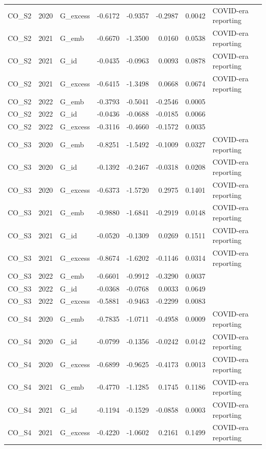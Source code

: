 \begin{tabular}{lllrrrrl}
CO\_S2 & 2020 & G\_excess & -0.6172 & -0.9357 & -0.2987 & 0.0042 & COVID-era reporting \\
CO\_S2 & 2021 & G\_emb & -0.6670 & -1.3500 & 0.0160 & 0.0538 & COVID-era reporting \\
CO\_S2 & 2021 & G\_id & -0.0435 & -0.0963 & 0.0093 & 0.0878 & COVID-era reporting \\
CO\_S2 & 2021 & G\_excess & -0.6415 & -1.3498 & 0.0668 & 0.0674 & COVID-era reporting \\
CO\_S2 & 2022 & G\_emb & -0.3793 & -0.5041 & -0.2546 & 0.0005 &  \\
CO\_S2 & 2022 & G\_id & -0.0436 & -0.0688 & -0.0185 & 0.0066 &  \\
CO\_S2 & 2022 & G\_excess & -0.3116 & -0.4660 & -0.1572 & 0.0035 &  \\
CO\_S3 & 2020 & G\_emb & -0.8251 & -1.5492 & -0.1009 & 0.0327 & COVID-era reporting \\
CO\_S3 & 2020 & G\_id & -0.1392 & -0.2467 & -0.0318 & 0.0208 & COVID-era reporting \\
CO\_S3 & 2020 & G\_excess & -0.6373 & -1.5720 & 0.2975 & 0.1401 & COVID-era reporting \\
CO\_S3 & 2021 & G\_emb & -0.9880 & -1.6841 & -0.2919 & 0.0148 & COVID-era reporting \\
CO\_S3 & 2021 & G\_id & -0.0520 & -0.1309 & 0.0269 & 0.1511 & COVID-era reporting \\
CO\_S3 & 2021 & G\_excess & -0.8674 & -1.6202 & -0.1146 & 0.0314 & COVID-era reporting \\
CO\_S3 & 2022 & G\_emb & -0.6601 & -0.9912 & -0.3290 & 0.0037 &  \\
CO\_S3 & 2022 & G\_id & -0.0368 & -0.0768 & 0.0033 & 0.0649 &  \\
CO\_S3 & 2022 & G\_excess & -0.5881 & -0.9463 & -0.2299 & 0.0083 &  \\
CO\_S4 & 2020 & G\_emb & -0.7835 & -1.0711 & -0.4958 & 0.0009 & COVID-era reporting \\
CO\_S4 & 2020 & G\_id & -0.0799 & -0.1356 & -0.0242 & 0.0142 & COVID-era reporting \\
CO\_S4 & 2020 & G\_excess & -0.6899 & -0.9625 & -0.4173 & 0.0013 & COVID-era reporting \\
CO\_S4 & 2021 & G\_emb & -0.4770 & -1.1285 & 0.1745 & 0.1186 & COVID-era reporting \\
CO\_S4 & 2021 & G\_id & -0.1194 & -0.1529 & -0.0858 & 0.0003 & COVID-era reporting \\
CO\_S4 & 2021 & G\_excess & -0.4220 & -1.0602 & 0.2161 & 0.1499 & COVID-era reporting \\

\end{tabular}
